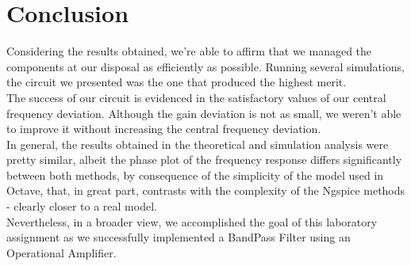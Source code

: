 \section{Conclusion}
\label{sec:conclusion}

Considering the results obtained, we’re able to affirm that we managed the components at our disposal as efficiently as possible. Running several simulations, the circuit we presented was the one that produced the highest merit.\\

The success of our circuit is evidenced in the satisfactory values of our central frequency deviation. Although the gain deviation is not as small, we weren’t able to improve it without increasing the central frequency deviation.\\

In general, the results obtained in the theoretical and simulation analysis were pretty similar, albeit the phase plot of the frequency response differs significantly between both methods, by consequence of the simplicity of the model used in Octave, that, in great part, contrasts with the complexity of the Ngspice methods - clearly closer to a real model.\\

Nevertheless, in a broader view, we accomplished the goal of this laboratory assignment as we successfully implemented a BandPass Filter using an Operational Amplifier.
